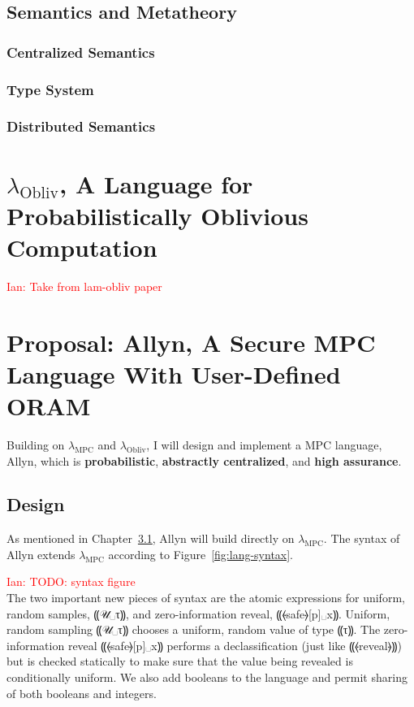 \documentclass{report}
\newcommand{\lang}{Allyn\xspace}
\newcommand{\mpc}{\ensuremath{\lambda_{\mathrm{MPC}}}\xspace}
\newcommand{\obliv}{\ensuremath{\lambda_{\mathrm{Obliv}}}\xspace}
\newcommand{\ins}[1]{\textcolor{red}{Ian: #1}}
\begin{document}
\section{Semantics and Metatheory}
\label{sec:lam-mpc-meta}

\subsection{Centralized Semantics}

\subsection{Type System}

\subsection{Distributed Semantics}

\chapter{\obliv, A Language for Probabilistically Oblivious Computation}
\label{ch:lam-obliv}

\ins{Take from lam-obliv paper}

\chapter{Proposal: \lang, A Secure MPC Language With User-Defined ORAM}
\label{ch:proposal}

Building on \mpc and \obliv, I will design and implement a MPC language, \lang, which is \textbf{probabilistic},
\textbf{abstractly centralized}, and \textbf{high assurance}.

\section{Design}

As mentioned in Chapter~\ref{}, \lang will build directly on \mpc. The syntax of \lang extends \mpc according to Figure~\ref{fig:lang-syntax}.

\ins{TODO: syntax figure} \\

The two important new pieces of syntax are the atomic expressions for uniform, random samples, ⸨𝒰␣τ⸩,
and zero-information reveal, ⸨⦑safe⦒[p]␣x⸩.
Uniform, random sampling ⸨𝒰␣τ⸩ chooses a uniform, random value of type ⸨τ⸩. The zero-information reveal ⸨⦑safe⦒[p]␣x⸩ performs a
declassification (just like ⸨⦑reveal⦒⸩) but is checked statically to make sure that the value being revealed is conditionally
uniform. We also add booleans to the language and permit sharing of both booleans and integers.
\end{document}
